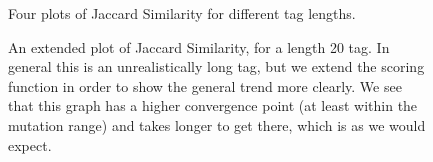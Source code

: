 \documentclass{l4proj}
\begin{document}
\begin{figure} \label{fig:jaccards}
    \centering

    \caption{Four plots of Jaccard Similarity for different tag lengths.}

    \label{fig:jaccards}
\end{figure}

\begin{figure} \label{fig:jaccard20}
    \centering

    \caption{An extended plot of Jaccard Similarity, for a length 20 tag. In general this is an unrealistically long tag, but we extend the scoring function in order to show the general trend more clearly. We see that this graph has a higher convergence point (at least within the mutation range) and takes longer to get there, which is as we would expect.}

    \label{fig:jaccard20}
\end{figure}
\end{document}
